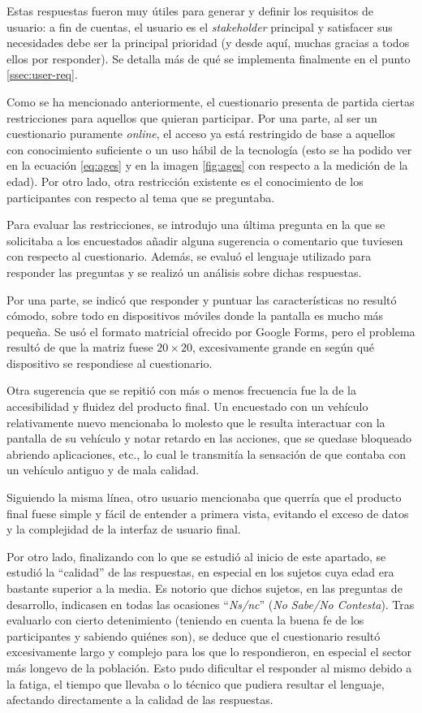 Estas respuestas fueron muy útiles para generar y definir los requisitos de usuario:
a fin de cuentas, el usuario es el \textit{stakeholder} principal y satisfacer sus
necesidades debe ser la principal prioridad (y desde aquí, muchas gracias a todos
ellos por responder). Se detalla más de qué se implementa finalmente en el punto
\ref{ssec:user-req}.

Como se ha mencionado anteriormente, el cuestionario presenta de partida ciertas
restricciones para aquellos que quieran participar. Por una parte, al ser un cuestionario
puramente \textit{online}, el acceso ya está restringido de base a aquellos con
conocimiento suficiente o un uso hábil de la tecnología (esto se ha podido ver
en la ecuación \ref{eq:ages} y en la imagen \ref{fig:ages} con respecto a la medición
de la edad). Por otro lado, otra restricción existente es el conocimiento de los
participantes con respecto al tema que se preguntaba.

Para evaluar las restricciones, se introdujo una última pregunta en la que se
solicitaba a los encuestados añadir alguna sugerencia o comentario que tuviesen con
respecto al cuestionario. Además, se evaluó el lenguaje utilizado para responder las
preguntas y se realizó un análisis sobre dichas respuestas.

Por una parte, se indicó que responder y puntuar las características no resultó
cómodo, sobre todo en dispositivos móviles donde la pantalla es mucho más pequeña.
Se usó el formato matricial ofrecido por Google Forms, pero el problema resultó
de que la matriz fuese $20 \times 20$, excesivamente grande en según qué dispositivo
se respondiese al cuestionario.

Otra sugerencia que se repitió con más o menos frecuencia fue la de la accesibilidad
y fluidez del producto final. Un encuestado con un vehículo relativamente nuevo
mencionaba lo molesto que le resulta interactuar con la pantalla de su vehículo y notar
retardo en las acciones, que se quedase bloqueado abriendo aplicaciones, etc., lo cual
le transmitía la sensación de que contaba con un vehículo antiguo y de mala calidad.

Siguiendo la misma línea, otro usuario mencionaba que querría que el producto final
fuese simple y fácil de entender a primera vista, evitando el exceso de datos y la
complejidad de la interfaz de usuario final.

Por otro lado, finalizando con lo que se estudió al inicio de este apartado, se
estudió la ``calidad'' de las respuestas, en especial en los sujetos cuya edad
era bastante superior a la media. Es notorio que dichos sujetos, en las preguntas
de desarrollo, indicasen en todas las ocasiones ``\textit{Ns/nc}'' (\textit{No Sabe/No Contesta}).
Tras evaluarlo con cierto detenimiento (teniendo en cuenta la buena fe de los
participantes y sabiendo quiénes son), se deduce que el cuestionario resultó
excesivamente largo y complejo para los que lo respondieron, en especial el sector
más longevo de la población. Esto pudo dificultar el responder al mismo debido
a la fatiga, el tiempo que llevaba o lo técnico que pudiera resultar el lenguaje,
afectando directamente a la calidad de las respuestas.

